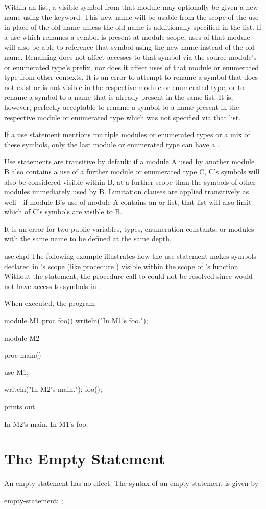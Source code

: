 Within an  list, a visible symbol from that module may optionally be
given a new name using the  keyword.  This new name will be usable from
the scope of the use in place of the old name unless the old name is
additionally specified in the  list.  If a use which renames a symbol
is present at module scope, uses of that module will also be able to reference
that symbol using the new name instead of the old name.  Renaming does not
affect accesses to that symbol via the source module's or enumerated type's
prefix, nor does it affect uses of that module or enumerated type from other
contexts.  It is an error to attempt to rename a symbol that does not exist or
is not visible in the respective module or enumerated type, or to rename a
symbol to a name that is already present in the same  list.  It is,
however, perfectly acceptable to rename a symbol to a name present in the
respective module or enumerated type which was not specified via
that  list.

If a use statement mentions multiple modules or enumerated types or a mix of
these symbols, only the last module or enumerated type can have a
.

Use statements are transitive by default: if a module A used by another module B
also contains a use of a further module or enumerated type C, C's symbols will
also be considered visible within B, at a further scope than the symbols of
other modules immediately used by B.  Limitation clauses are applied
transitively as well - if module B's use of module A contains an
 or  list, that list will also limit which of C's
symbols are visible to B.


It is an error for two public variables, types, enumeration constants, or
modules with the same name to be defined at the same depth.

\begin{chapelexample}{use.chpl}
  The following example illustrates how the use statement makes
  symbols declared in 's scope (like procedure
  ) visible within the scope of 's 
  function.  Without the  statement, the procedure call to
   could not be resolved since  would not have
  access to symbols in .

  When executed, the program
\begin{chapel}
module M1 {
  proc foo() {
    writeln("In M1's foo.");
  }
}

module M2 {
  proc main() {
    use M1;

    writeln("In M2's main.");
    foo();
  }
}
\end{chapel}
prints out
\begin{chapelprintoutput}{}
In M2's main.
In M1's foo.
\end{chapelprintoutput}
\end{chapelexample}


\section{The Empty Statement}
\label{The_Empty_Statement}

An empty statement has no effect.  The syntax of an empty statement is
given by
\begin{syntax}
empty-statement:
  ;
\end{syntax}
